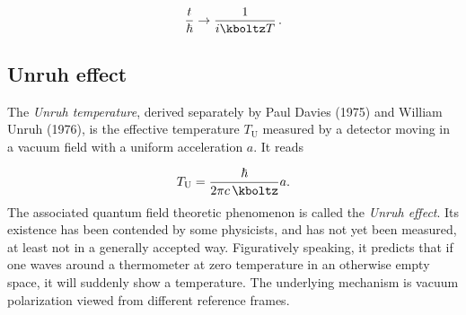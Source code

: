 \begin{equation*}
  \frac{t}{\hbar} \rightarrow \frac{1}{i \kboltz T}\,.
\end{equation*}


\subsection*{Unruh effect}

The \emph{Unruh temperature}, derived separately by Paul Davies (1975) and William Unruh (1976), is the effective temperature $T_{\text{U}}$ measured by a detector moving in a vacuum field with a uniform acceleration $a$. It reads

\begin{equation*}\label{eq:Unruh}
  T_{\text{U}}=\frac{\hbar}{2 \pi c\, \kboltz} a.
\end{equation*}
%
The associated quantum field theoretic phenomenon is called the \emph{Unruh effect}. Its existence has been contended by some physicists, and has not yet been measured, at least not in a generally accepted way. Figuratively speaking, it predicts that if one waves around a thermometer at zero temperature in an otherwise empty space, it will suddenly show a temperature. The underlying mechanism is vacuum polarization viewed from different reference frames.

